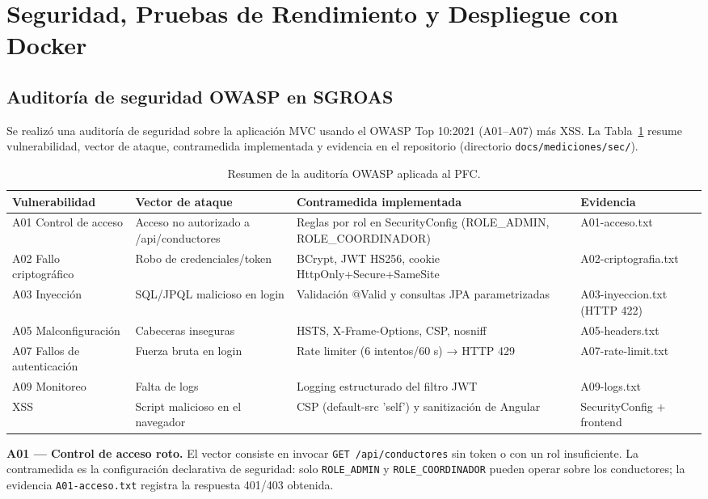 \section{Seguridad, Pruebas de Rendimiento y Despliegue con Docker}
\subsection{Auditoría de seguridad OWASP en SGROAS}

Se realizó una auditoría de seguridad sobre la aplicación MVC usando el OWASP Top 10:2021 (A01--A07) más XSS. La
Tabla~\ref{tab:owasp} resume vulnerabilidad, vector de ataque, contramedida implementada y evidencia en el
repositorio (directorio \texttt{docs/mediciones/sec/}).

\begin{table}[H]
\centering
\footnotesize
\setlength{\tabcolsep}{4pt}
\begin{tabular}{@{}p{2.4cm}p{2.9cm}p{3.3cm}p{2.6cm}@{}}
\toprule
\textbf{Vulnerabilidad} & \textbf{Vector de ataque} & \textbf{Contramedida implementada} & \textbf{Evidencia} \\
\midrule
A01 Control de acceso & Acceso no autorizado a /api/conductores & Reglas por rol en SecurityConfig (ROLE\_ADMIN, ROLE\_COORDINADOR) & A01-acceso.txt \\
A02 Fallo criptográfico & Robo de credenciales/token & BCrypt, JWT HS256, cookie HttpOnly+Secure+SameSite & A02-criptografia.txt \\
A03 Inyección & SQL/JPQL malicioso en login & Validación @Valid y consultas JPA parametrizadas & A03-inyeccion.txt (HTTP 422) \\
A05 Malconfiguración & Cabeceras inseguras & HSTS, X-Frame-Options, CSP, nosniff & A05-headers.txt \\
A07 Fallos de autenticación & Fuerza bruta en login & Rate limiter (6 intentos/60 s) → HTTP 429 & A07-rate-limit.txt \\
A09 Monitoreo & Falta de logs & Logging estructurado del filtro JWT & A09-logs.txt \\
XSS & Script malicioso en el navegador & CSP (default-src 'self') y sanitización de Angular & SecurityConfig + frontend \\
\bottomrule
\end{tabular}
\caption{Resumen de la auditoría OWASP aplicada al PFC.}
\label{tab:owasp}
\end{table}

\textbf{A01 — Control de acceso roto.} El vector consiste en invocar \texttt{GET /api/conductores} sin token o con
un rol insuficiente. La contramedida es la configuración declarativa de seguridad: solo
\texttt{ROLE\_ADMIN} y \texttt{ROLE\_COORDINADOR} pueden operar sobre los conductores; la evidencia
\texttt{A01-acceso.txt} registra la respuesta 401/403 obtenida.

